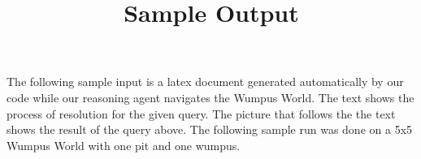 \documentclass[10pt,a4paper]{article}
\title{Sample Output}
\begin{document}
	\maketitle
	The following sample input is a latex document generated automatically by our code while our reasoning agent navigates the Wumpus World. The text shows the process of resolution for the given query. The picture that follows the the text shows the result of the query above. The following sample run was done on a 5x5 Wumpus World with one pit and one wumpus.
	
	\tiny
	\noindent
	
	
	
	
	
\end{document}

